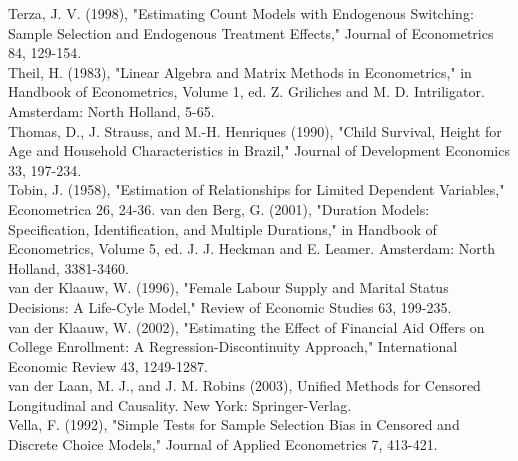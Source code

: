 \documentclass[10pt]{article}
\begin{document}
Terza, J. V. (1998), "Estimating Count Models with Endogenous Switching: Sample Selection and Endogenous Treatment Effects," Journal of Econometrics 84, 129-154.\\
Theil, H. (1983), "Linear Algebra and Matrix Methods in Econometrics," in Handbook of Econometrics, Volume 1, ed. Z. Griliches and M. D. Intriligator. Amsterdam: North Holland, 5-65.\\
Thomas, D., J. Strauss, and M.-H. Henriques (1990), "Child Survival, Height for Age and Household Characteristics in Brazil," Journal of Development Economics 33, 197-234.\\
Tobin, J. (1958), "Estimation of Relationships for Limited Dependent Variables," Econometrica 26, 24-36. van den Berg, G. (2001), "Duration Models: Specification, Identification, and Multiple Durations," in Handbook of Econometrics, Volume 5, ed. J. J. Heckman and E. Leamer. Amsterdam: North Holland, 3381-3460.\\
van der Klaauw, W. (1996), "Female Labour Supply and Marital Status Decisions: A Life-Cyle Model," Review of Economic Studies 63, 199-235.\\
van der Klaauw, W. (2002), "Estimating the Effect of Financial Aid Offers on College Enrollment: A Regression-Discontinuity Approach," International Economic Review 43, 1249-1287.\\
van der Laan, M. J., and J. M. Robins (2003), Unified Methods for Censored Longitudinal and Causality. New York: Springer-Verlag.\\
Vella, F. (1992), "Simple Tests for Sample Selection Bias in Censored and Discrete Choice Models," Journal of Applied Econometrics 7, 413-421.
\end{document}
